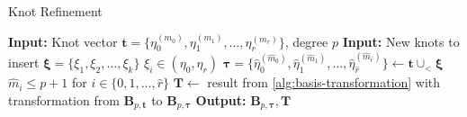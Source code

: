 \begin{algorithm}
    \caption{Knot Refinement}
    \begin{algorithmic}[1]
        \label{alg:knot-refinement}
        \State \textbf{Input:} Knot vector $\mathbf t = \{\eta_0^{(m_0)}, \eta_1^{(m_1)}, \dots, \eta_r^{(m_r)}\}$, degree $p$
        \State \textbf{Input:} New knots to insert $\boldsymbol \xi = \{\xi_1, \xi_2, \dots, \xi_k\}$
        \Ensure $\xi_i \in (\eta_0, \eta_r)$
        \State $\boldsymbol \tau = \{\hat\eta_0^{(\hat m_0)}, \hat\eta_1^{(\hat m_1)}, \dots, \hat\eta_{\hat r}^{(\hat m_{\hat r})}\} \gets \mathbf t \cup_< \boldsymbol \xi$ 
        \Ensure $\hat m_i \leq p+1$ for $i \in \{0,1,\ldots,\hat r\}$
        \State $\mathbf T \gets $ result from \cref{alg:basis-transformation} with transformation from $\mathbf B_{p,\mathbf t}$ to $\mathbf B_{p,\boldsymbol \tau}$
        \State \textbf{Output:} $\mathbf B_{p, \boldsymbol \tau}, \mathbf T$
    \end{algorithmic}
\end{algorithm}

